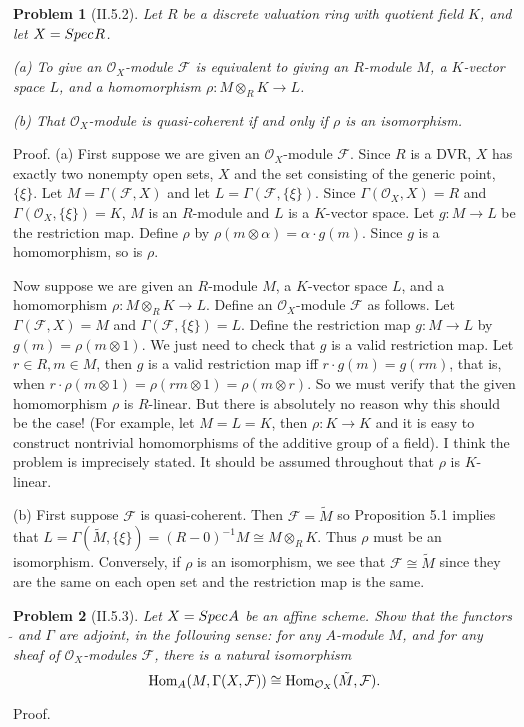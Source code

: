 \documentclass[12pt]{article}
\newcommand{\sox}{\mathcal{O}_X}
\renewcommand{\sf}{\mathcal{F}}
\renewcommand{\hom}{\mbox{\rm Hom}}
\newcommand{\tensor}{\otimes}
\newcommand{\tens}{\otimes}
\newtheorem{prob}{Problem}
\newcommand{\spec}{Spec \hspace{.01in}}
\newcommand{\proof}{\mbox{\sc Proof.\hspace{.1in}}}
\begin{document}
\begin{prob}[II.5.2]
Let $R$ be a discrete valuation ring with quotient field
$K$, and let $X=\spec R$. 

(a) To give an $\sox$-module $\sf$ is equivalent to giving
an $R$-module $M$, a $K$-vector space $L$, and a
homomorphism $\rho:M\tensor_R K\rightarrow L$. 

(b) That $\sox$-module is quasi-coherent if and only
if $\rho$ is an isomorphism. 
\end{prob}
\proof
(a) First suppose we are given an $\sox$-module $\sf$. Since $R$
is a DVR, $X$ has exactly two nonempty open sets,
$X$ and the set consisting of the generic point, 
$\{\xi\}$. Let $M=\Gamma(\sf,X)$ and let 
$L=\Gamma(\sf,\{\xi\})$. 
Since $\Gamma(\sox,X)=R$ and $\Gamma(\sox,\{\xi\})=K$, $M$ is
an $R$-module and $L$ is a $K$-vector space. Let
$g:M\rightarrow L$ be the restriction map. Define
$\rho$ by $\rho(m\tens\alpha)=\alpha\cdot{}g(m)$. 
Since $g$ is a homomorphism, so is $\rho$. 

Now suppose we are given an $R$-module $M$, a $K$-vector
space $L$, and a homomorphism $\rho:M\tensor_R K\rightarrow L$.
Define an $\sox$-module $\sf$ as follows. Let 
$\Gamma(\sf,X)=M$ and $\Gamma(\sf,\{\xi\})=L$. Define
the restriction map $g:M\rightarrow L$ by
$g(m)=\rho(m\tens 1)$. We just need to check that
$g$ is a valid restriction map. Let $r\in R, m\in M$,
then $g$ is a valid restriction map iff
$r\cdot g(m)=g(rm)$, that is, when
$r\cdot \rho(m\tens 1)=\rho(rm\tens 1)=\rho(m\tens r)$. 
So we must verify that the given homomorphism $\rho$ is 
$R$-linear. But there is absolutely no reason why this should
be the case! (For example, let $M=L=K$, then 
$\rho:K\rightarrow K$ and it is easy to construct nontrivial
homomorphisms of the additive group of a field). 
I think the problem is imprecisely stated. It 
should be assumed throughout that $\rho$ is $K$-linear.

(b) First suppose $\sf$ is quasi-coherent. Then 
$\sf=\tilde{M}$ so
Proposition 5.1 implies that
$L=\Gamma(\tilde{M},\{\xi\})=(R-0)^{-1}M\cong
M\tensor_R K$. Thus $\rho$ must be an isomorphism.
Conversely, if $\rho$ is an isomorphism, we see that
$\sf\cong \tilde{M}$ since they are the same on
each open set and the restriction map is the 
same. 

\begin{prob}[II.5.3]
Let $X=\spec A$ be an affine scheme. Show that the functors
$\tilde{}$ and $\Gamma$ are adjoint, in the
following sense: for any $A$-module $M$, and for any sheaf
of $\sox$-modules $\sf$, there is a natural isomorphism
$$\hom_A(M,\Gamma(X,\sf))\cong\hom_{\sox}(\tilde{M},\sf).$$
\end{prob}
\proof
\end{document}
